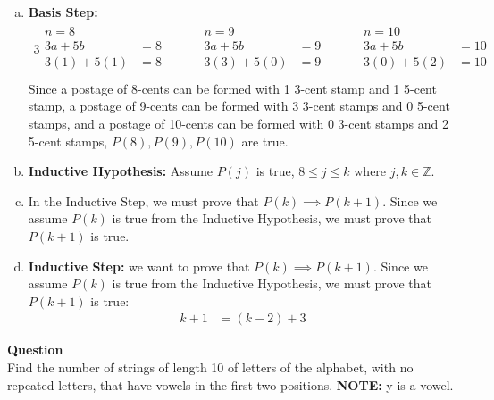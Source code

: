 \documentclass[article,12pt]{article}
\newcounter{question}
\def\questionnum{{\Large\bfseries{Question \arabic{question} }}\\[1em]}
\newcommand{\question}{
    \stepcounter{question}
    \questionnum
}
\newcommand{\ints}{\mathbb{Z}}
\begin{document}
\begin{enumerate}[a)]
    \item 
    \textbf{Basis Step:}
    \begin{alignat*}{3}
        \begin{aligned}
            n = 8 \\
            3a + 5b &= 8 \\
            3(1) + 5(1) &= 8 \\
        \end{aligned} \quad &&
        \begin{aligned}
            n = 9 \\
            3a + 5b &= 9 \\
            3(3) + 5(0) &= 9 \\
        \end{aligned} \quad &&
        \begin{aligned}
            n = 10 \\
            3a + 5b &= 10 \\
            3(0) + 5(2) &= 10 \\
        \end{aligned}
    \end{alignat*}
    Since a postage of 8-cents can be formed with 1 3-cent stamp and 1 5-cent stamp, a postage of 9-cents can be formed with 3 3-cent stamps and 0 5-cent stamps, and a postage of 10-cents can be formed with 0 3-cent stamps and 2 5-cent stamps, $P(8),P(9),P(10)$ are true.
    \item 
    \textbf{Inductive Hypothesis:} Assume $P(j)$ is true, $8 \leq j \leq k$ where $j,k \in \ints$.
    \item 
    In the Inductive Step, we must prove that $P(k) \implies P(k+1)$. Since we assume $P(k)$ is true from the Inductive Hypothesis, we must prove that $P(k+1)$ is true.
    \item 
    \textbf{Inductive Step:} we want to prove that $P(k) \implies P(k+1)$. Since we assume $P(k)$ is true from the Inductive Hypothesis, we must prove that $P(k+1)$ is true: 
    \begin{align*}
        k + 1 &= (k - 2) + 3
    \end{align*}
\end{enumerate}
\newpage
\question
Find the number of strings of length 10 of letters of the alphabet, with no repeated letters, that have vowels in the first two positions. {\bf NOTE:} y is a vowel. \\
\\
\end{document}
